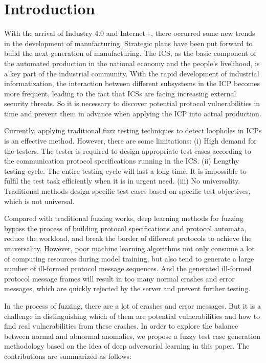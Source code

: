 \section{Introduction}

With the arrival of Industry 4.0 \cite{lasi2014industry} and Internet+, there occurred some new trends in the development of manufacturing. Strategic plans have been put forward to build the next generation of manufacturing. %
The ICS, as the basic component of the automated production in the national economy and the people's livelihood, is a key part of the industrial community. With the rapid development of industrial informatization, the interaction between different subsystems in the ICP becomes more frequent, leading to the fact that ICSs are facing increasing external security threats. So it is necessary to discover potential protocol vulnerabilities in time and prevent them in advance when applying the ICP into actual production.

Currently, applying traditional fuzz testing techniques to detect loopholes in ICPs is an effective method. However, there are some limitations: (i) High demand for the testers. The tester is required to design appropriate test cases according to the communication protocol specifications running in the ICS. (ii) Lengthy testing cycle. The entire testing cycle will last a long time. It is impossible to fulfil the test task efficiently when it is in urgent need. (iii) No universality. Traditional methods design specific test cases based on specific test objectives, which is not universal.

Compared with traditional fuzzing works, deep learning methods for fuzzing bypass the process of building protocol specifications and protocol automata, reduce the workload, and break the border of different protocols to achieve the universality. However, poor machine learning algorithms not only consume a lot of computing resources during model training, but also tend to generate a large number of ill-formed protocol message sequences. And the generated ill-formed protocol message frames will result in too many normal crashes and error messages, which are quickly rejected by the server and prevent further testing.

In the process of fuzzing, there are a lot of crashes and error messages. But it is a challenge in distinguishing which of them are potential vulnerabilities and how to find real vulnerabilities from these crashes. In order to explore the balance between normal and abnormal anomalies, we propose a fuzzy test case generation methodology based on the idea of deep adversarial learning in this paper. The contributions are summarized as follows:


